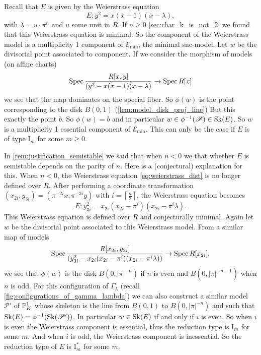 Recall that $E$ is given by the Weierstrass equation 
\begin{equation}\label{eq:weierstrass_dist}
	E: y^2 = x(x-1)(x-\lambda)
,\end{equation}
with $\lambda = u \cdot \pi^{n}$ and $u$ some unit in $R$. 
If $n \ge 0$ \cref{sec:char_k_is_not_2} we found that this Weierstrass equation is minimal.
So the component of the Weierstrass model is a multiplicity 1 component of $\mathscr E_\text{min} $, the minimal snc-model. 
Let $w$ be the divisorial point associated to component.
If we consider the morphism of models (on affine charts) \[
	\operatorname{Spec} \frac{R[x, y]}{(y^2 - x(x-1)(x-\lambda)} \to \operatorname{Spec} R[x]
\]
we see that the map dominates on the special fiber. 
So $\phi(w)$ is the point corresponding to the disk $B(0, 1)$ (\cref{lem:model_disk_proj_line})
But this exactly the point $b$. So $\phi(w) = b$ and in particular $w \in \phi^{-1}(\mathscr P) \in \sk(E)$. 
So $w$ is a multiplicity 1 essential component of $\mathscr E_\text{min} $.
This can only be the case if $E$ is of type $\mathrm I_{m}$ for some $m \ge 0$. 

\medskip

In \cref{rem:justification_semistable} we said that when $n < 0$ we that whether $E$ is semistable depends on the parity of $n$. 
Here is a (conjectural) explanation for this. 
When $n < 0$, the Weierstrass equation \eqref{eq:weierstrass_dist} is no longer defined over $R$. 
After performing a coordinate transformation $(x_{2i}, y_{3i}) = (\pi^{-2i}x, \pi^{-3i}y)$ with $i = \left\lceil \frac{n}{2} \right\rceil $, the Weierstrass equation becomes \[
	E: y_{3i}^2 = x_{2i}(x_{2i}-\pi^{i})(x_{2i} - \pi^{i}\lambda)
.\] 
This Weierstrass equation is defined over $R$ and conjecturally minimal. 
Again let $w$ be the divisorial point associated to this Weierstrass model. 
From a similar map of models \[
	\operatorname{Spec} \frac{R[x_{2i}, y_{2i}]}{\left(y_{3i}^2 - x_{2i}(x_{2i}-\pi^{i})(x_{2i} - \pi^{i}\lambda)\right)} 
	\to \operatorname{Spec} R[x_{2i}]
,\] 
we see that $\phi(w)$ is the disk $B(0, |\pi|^{-n})$ if $n$ is even and $B(0,|\pi|^{-n-1}) $ when $n$ is odd. 
For this configuration of $\Gamma_\lambda$ (recall \cref{fig:configurations_of_gamma_lambda}) we can also construct a similar model $\mathscr P'$ of $\mathbb{P}^{1}_K$ whose skeleton is the line from $B(0, 1)$ to $B(0, |\pi|^{-n})$ and such that $\sk(E) = \phi^{-1}(\sk(\mathscr P'))$.
In particular $w \in \operatorname{Sk}(E)$  if and only if $i$ is even. 
So when $i$ is even the Weierstrass component is essential, thus the reduction type is $\mathrm I_m$ for some $m$. 
And when  $i$ is odd, the Weierstrass component is inessential. 
So the reduction type of $E$ is $\mathrm I_m^*$ for some $m$. 





